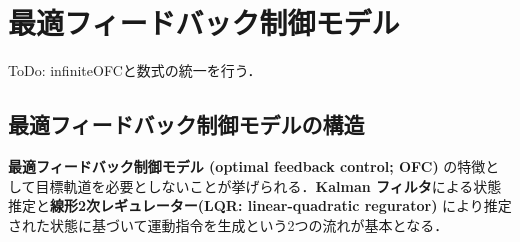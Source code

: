 \section{最適フィードバック制御モデル}
ToDo: infiniteOFCと数式の統一を行う．

\subsection{最適フィードバック制御モデルの構造}
\textbf{最適フィードバック制御モデル (optimal feedback control; OFC)} の特徴として目標軌道を必要としないことが挙げられる．\textbf{Kalman フィルタ}による状態推定と\textbf{線形2次レギュレーター(LQR: linear-quadratic regurator)} により推定された状態に基づいて運動指令を生成という2つの流れが基本となる．
